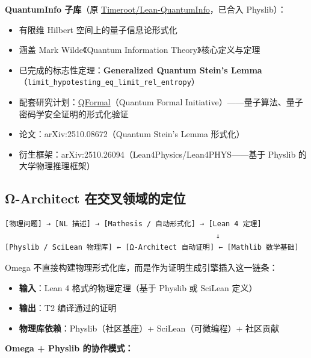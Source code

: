 \documentclass[
  11pt,
  a4paper,
]{ctexrep}
\providecommand{\tightlist}{%
  \setlength{\itemsep}{0pt}\setlength{\parskip}{0pt}}
\begin{document}
\textbf{QuantumInfo 子库}（原
\href{https://github.com/Timeroot/Lean-QuantumInfo}{Timeroot/Lean-QuantumInfo}，已合入
Physlib）：

\begin{itemize}
\tightlist
\item
  有限维 Hilbert 空间上的量子信息论形式化
\item
  涵盖 Mark Wilde《Quantum Information Theory》核心定义与定理
\item
  已完成的标志性定理：\textbf{Generalized Quantum Stein's
  Lemma}（\texttt{limit\_hypotesting\_eq\_limit\_rel\_entropy}）
\item
  配套研究计划：\href{https://qform.al}{QFormal}（Quantum Formal
  Initiative）------量子算法、量子密码学安全证明的形式化验证
\item
  论文：arXiv:2510.08672（Quantum Stein's Lemma 形式化）
\item
  衍生框架：arXiv:2510.26094（Lean4Physics/Lean4PHYS------基于 Physlib
  的大学物理推理框架）
\end{itemize}

\subsection{Ω-Architect
在交叉领域的定位}\label{ux3c9-architect-ux5728ux4ea4ux53c9ux9886ux57dfux7684ux5b9aux4f4d}

\begin{verbatim}
[物理问题] → [NL 描述] → [Mathesis / 自动形式化] → [Lean 4 定理]
                                                 ↓
[Physlib / SciLean 物理库] ← [Ω-Architect 自动证明] ← [Mathlib 数学基础]
\end{verbatim}

Omega 不直接构建物理形式化库，而是作为证明生成引擎插入这一链条：

\begin{itemize}
\tightlist
\item
  \textbf{输入}：Lean 4 格式的物理定理（基于 Physlib 或 SciLean 定义）
\item
  \textbf{输出}：T2 编译通过的证明
\item
  \textbf{物理库依赖}：Physlib（社区基座）+ SciLean（可微编程）+
  社区贡献
\end{itemize}

\textbf{Omega + Physlib 的协作模式：}
\end{document}
